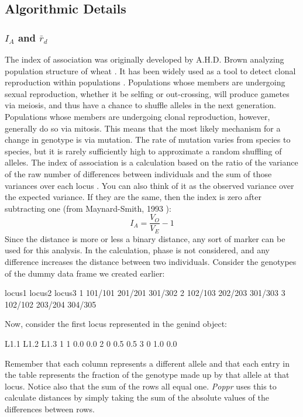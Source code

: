 \documentclass[letterpaper]{article}
\newcommand{\beq}{\begin{equation}}
\newcommand{\eeq}{\end{equation}}
\newcommand{\tab}{\hspace*{1em}}
\begin{document}
\subsection{Algorithmic Details}\label{appendix:algorithm}
\subsubsection{$I_A$ and $\bar r_d$}\label{appendix:algorithm:iard}

\tab \tab The index of association was originally developed by A.H.D. Brown analyzing population structure of wheat \cite{Brown:1980}. It has been widely used as a tool to detect clonal reproduction within populations \cite{Smith:1993}. Populations whose members are undergoing sexual reproduction, whether it be selfing or out-crossing, will produce gametes via meiosis, and thus have a chance to shuffle alleles in the next generation. Populations whose members are undergoing clonal reproduction, however, generally do so via mitosis. This means that the most likely mechanism for a change in genotype is via mutation. The rate of mutation varies from species to species, but it is rarely sufficiently high to approximate a random shuffling of alleles. The index of association is a calculation based on the ratio of the variance of the raw number of differences between individuals and the sum of those variances over each locus \cite{Smith:1993}. You can also think of it as the observed variance over the expected variance. If they  are the same, then the index is zero after subtracting one (from Maynard-Smith, 1993 \cite{Smith:1993}):
\beq
\label{eq:I_A}
I_A = \frac{V_O}{V_E}-1
\eeq
Since the distance is more or less a binary distance, any sort of marker can be used for this analysis. In the calculation, phase is not considered, and any difference increases the distance between two individuals. Consider the genotypes of the dummy data frame we created earlier:
\begin{Schunk}
\begin{Soutput}
   locus1  locus2  locus3
1 101/101 201/201 301/302
2 102/103 202/203 301/303
3 102/102 203/204 304/305
\end{Soutput}
\end{Schunk}
Now, consider the first locus represented in the genind object:
\begin{Schunk}
\begin{Soutput}
  L1.1 L1.2 L1.3
1    1  0.0  0.0
2    0  0.5  0.5
3    0  1.0  0.0
\end{Soutput}
\end{Schunk}
Remember that each column represents a different allele and that each entry in the table represents the fraction of the genotype made up by that allele at that locus. Notice also that the sum of the rows all equal one. \textit{Poppr} uses this to calculate distances by simply taking the sum of the absolute values of the differences between rows.
\end{document}
